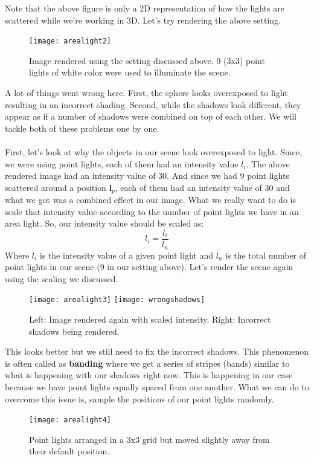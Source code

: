 \documentclass[11pt,a4paper]{article}
\begin{document}
	\noindent
	Note that the above figure is only a 2D representation of how the lights are scattered while we're working in 3D. Let's try rendering the above setting.
	\begin{figure}[H]
		\centering
		\captionsetup{justification=centering}
		\texttt{[image: arealight2]}\quad
		\caption{Image rendered using the setting discussed above. 9 (3x3) point lights of white color were used to illuminate the scene.}
	\end{figure}
	\noindent
	A lot of things went wrong here. First, the sphere looks overexposed to light resulting in an incorrect shading. Second, while the shadows look different, they appear as if a number of shadows were combined on top of each other. We will tackle both of these problems one by one.
	\\~\\
	\noindent
	First, let's look at why the objects in our scene look overexposed to light. Since, we were using point lights, each of them had an intensity value $l_{i}$. The above rendered image had an intensity value of $30$. And since we had 9 point lights scattered around a position $\boldsymbol{l}_{p}$, each of them had an intensity value of $30$ and what we got was a combined effect in our image. What we really want to do is scale that intensity value according to the number of point lights we have in an area light. So, our intensity value should be scaled as:
	\begin{equation}
		l_{i} = \frac{l_{i}}{l_{n}}
	\end{equation}
	\noindent
	Where $l_{i}$ is the intensity value of a given point light and $l_{n}$ is the total number of point lights in our scene (9 in our setting above). Let's render the scene again using the scaling we discussed.
	\begin{figure}[H]
		\centering
		\captionsetup{justification=centering}
		\texttt{[image: arealight3]}\quad
		\texttt{[image: wrongshadows]}\quad
		\caption{Left: Image rendered again with scaled intensity. Right: Incorrect shadows being rendered.}
	\end{figure}
	\noindent
	This looks better but we still need to fix the incorrect shadows. This phenomenon is often called as \textbf{banding} where we get a series of stripes (bands) similar to what is happening with our shadows right now. This is happening in our case because we have point lights equally spaced from one another. What we can do to overcome this issue is, sample the positions of our point lights randomly. 
	\begin{figure}[H]
		\centering
		\captionsetup{justification=centering}
		\texttt{[image: arealight4]}\quad
		\caption{Point lights arranged in a 3x3 grid but moved slightly away from their default position.}
	\end{figure}
\end{document}
